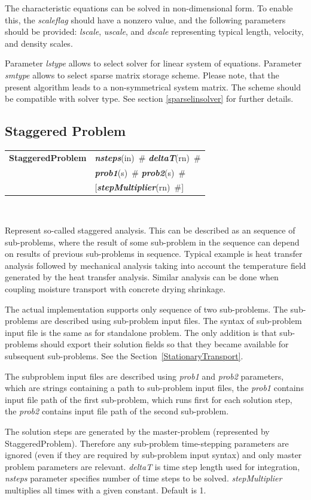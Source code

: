 \documentclass[a4paper]{article}
\makeatletter
\newcommand{\param}[1]{{\em #1}}
\newcommand{\keywordnotype}[1]{\mbox{{\it{\bf{#1}}}}}
\newcommand{\keyword}[2]{\mbox{{\keywordnotype{#1}\tiny (#2)}}}
\newcommand{\entKeywordInst}[1]{\mbox{{\bf{{#1}}}}}
\newcommand{\field}[2]{\mbox{\keyword{#1}{#2}~\#}}
\newcommand{\optField}[2]{\mbox{[\field{#1}{#2}]}}
\newenvironment{record}[1][]{\begin{tabular}{|ll}}{\end{tabular}\\}
\newcommand{\recentry}[2]{{#1}&{#2}\\}
\newcounter{rcc}
\newenvironment{record}[1][\textwidth]{\setcounter{rcc}{0}\begin{tabular*}{#1}{|ll@{\extracolsep{\fill}}r}}{\end{tabular*}\\}
\newcommand{\recentry}[2]{\ifthenelse{\value{rcc}>0}{&$\backslash$ \\}{\setcounter{rcc}{1}}{#1}&{#2}}
\makeatother
\begin{document}
The characteristic equations can be solved in non-dimensional form. To
enable this, the \param{scaleflag} should have a nonzero value,
and the following parameters should be provided: \param{lscale},
\param{uscale}, and \param{dscale} representing typical length,
velocity, and density scales.

Parameter \param{lstype} allows to select solver for linear system of
equations. Parameter \param{smtype} allows to select sparse matrix storage
scheme. Please note, that the present algorithm leads to a
non-symmetrical system
matrix. The scheme should be compatible with solver type. See section
\ref{sparselinsolver} for further details.

\subsection{Staggered Problem}
\label{staggeredproblem}
\begin{record}
\recentry{\entKeywordInst{StaggeredProblem}}{\field{nsteps}{in} \field{deltaT}{rn}}
\recentry{}{\field{prob1}{s} \field{prob2}{s}}
\recentry{}{\optField{stepMultiplier}{rn}}
\end{record}

Represent so-called staggered analysis. This can be described as an
sequence of sub-problems, where the result of some sub-problem in the
sequence can depend on results of previous sub-problems in sequence.
Typical example is heat transfer analysis followed by mechanical
analysis taking into account the temperature field generated by the
heat transfer analysis. Similar analysis can be done when coupling
moisture transport with concrete drying shrinkage.

The actual implementation supports only sequence of two sub-problems.
The sub-problems are described using sub-problem input files. The
syntax of sub-problem input file is the same as for standalone
problem. The only addition is that sub-problems should export their
solution fields so that they became available for subsequent
sub-problems. See the Section~\ref{StationaryTransport}.

The subproblem input files are described using
\param{prob1} and \param{prob2} parameters, which are strings
containing a path to sub-problem input files, the \param{prob1}
contains input file path of the first sub-problem, which runs first
for each solution step, the \param{prob2} contains input file path of
the second sub-problem. 

The solution steps are generated by the
master-problem (represented by StaggeredProblem). Therefore any
sub-problem time-stepping parameters are ignored (even if they are
required by sub-problem input syntax) and only master problem
parameters are relevant. \param{deltaT} is time step length used for
integration, \param{nsteps} parameter specifies
number of time steps to be solved. \param{stepMultiplier} multiplies all 
times with a given constant. Default is 1.
\end{document}
